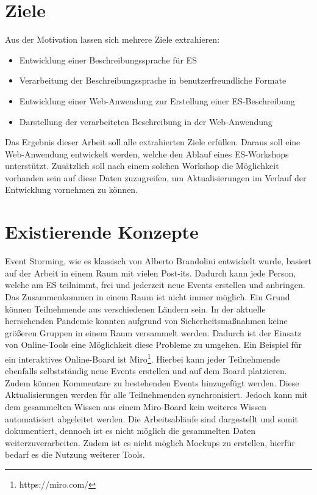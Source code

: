 \section{Ziele}\label{sec:ziele}
Aus der Motivation lassen sich mehrere Ziele extrahieren:

\begin{itemize}
    \item Entwicklung einer Beschreibungssprache für \ac{ES}
    \item Verarbeitung der Beschreibungssprache in benutzerfreundliche Formate
    \item Entwicklung einer Web-Anwendung zur Erstellung einer \ac{ES}-Beschreibung
    \item Darstellung der verarbeiteten Beschreibung in der Web-Anwendung
\end{itemize}

Das Ergebnis dieser Arbeit soll alle extrahierten Ziele erfüllen.
Daraus soll eine Web-Anwendung entwickelt werden, welche den Ablauf eines \ac{ES}-Workshops unterstützt.
Zusätzlich soll nach einem solchen Workshop die Möglichkeit vorhanden sein auf diese Daten zuzugreifen, um Aktualisierungen
im Verlauf der Entwicklung vornehmen zu können.


\section{Existierende Konzepte}\label{sec:existierende-konzepte}
Event Storming, wie es klassisch von Alberto Brandolini entwickelt wurde, basiert auf der Arbeit in einem Raum mit vielen Post-its\textsuperscript{\textregistered}.
Dadurch kann jede Person, welche am \ac{ES} teilnimmt, frei und jederzeit neue Events erstellen und anbringen.
Das Zusammenkommen in einem Raum ist nicht immer möglich.
Ein Grund können Teilnehmende aus verschiedenen Ländern sein.
In der aktuelle herrschenden Pandemie konnten aufgrund von Sicherheitsmaßnahmen keine größeren Gruppen in einem Raum versammelt werden.
Dadurch ist der Einsatz von Online-Tools eine Möglichkeit diese Probleme zu umgehen.
Ein Beispiel für ein interaktives Online-Board ist Miro\footnote{https://miro.com/}.
Hierbei kann jeder Teilnehmende ebenfalls selbstständig neue Events erstellen und auf dem Board platzieren.
Zudem können Kommentare zu bestehenden Events hinzugefügt werden.
Diese Aktualisierungen werden für alle Teilnehmenden synchronisiert.
Jedoch kann mit dem gesammelten Wissen aus einem Miro-Board kein weiteres Wissen automatisiert abgeleitet werden.
Die Arbeitsabläufe sind dargestellt und somit dokumentiert, dennoch ist es nicht möglich die gesammelten Daten
weiterzuverarbeiten.
Zudem ist es nicht möglich Mockups zu erstellen, hierfür bedarf es die Nutzung weiterer Tools.


